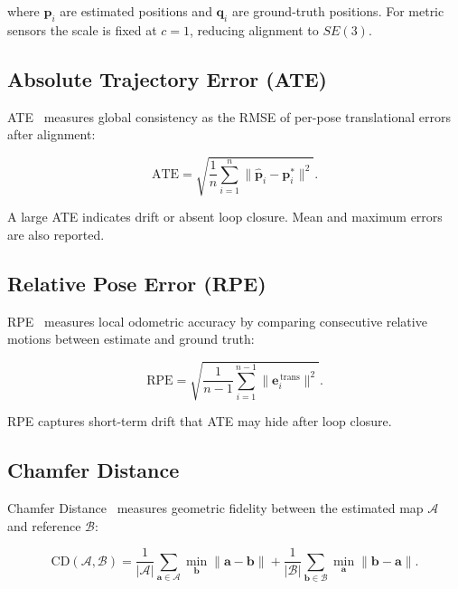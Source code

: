 \noindent where $\mathbf{p}_i$ are estimated positions and $\mathbf{q}_i$ are
ground-truth positions. For metric sensors the scale is fixed at $c = 1$,
reducing alignment to $SE(3)$.

\subsection{Absolute Trajectory Error (ATE)}

ATE~\cite{sturm2012benchmark} measures global consistency as the RMSE of
per-pose translational errors after alignment:

\begin{equation}
  \text{ATE} = \sqrt{\frac{1}{n}\sum_{i=1}^{n}
               \lVert \hat{\mathbf{p}}_i - \mathbf{p}_i^* \rVert^2}.
  \label{eq:ate}
\end{equation}

\noindent A large ATE indicates drift or absent loop closure. Mean and maximum
errors are also reported.

\subsection{Relative Pose Error (RPE)}

RPE~\cite{sturm2012benchmark} measures local odometric accuracy by comparing
consecutive relative motions between estimate and ground truth:

\begin{equation}
  \text{RPE} = \sqrt{\frac{1}{n-1}\sum_{i=1}^{n-1}
               \lVert \mathbf{e}_{i}^{\,\text{trans}} \rVert^2}.
  \label{eq:rpe}
\end{equation}

\noindent RPE captures short-term drift that ATE may hide after loop closure.

\subsection{Chamfer Distance}

Chamfer Distance~\cite{fan2017point} measures geometric fidelity between the
estimated map $\mathcal{A}$ and reference $\mathcal{B}$:

\begin{equation}
  \text{CD}(\mathcal{A},\mathcal{B}) =
    \frac{1}{|\mathcal{A}|}\sum_{\mathbf{a}\in\mathcal{A}}
      \min_{\mathbf{b}}\lVert\mathbf{a}-\mathbf{b}\rVert
    +
    \frac{1}{|\mathcal{B}|}\sum_{\mathbf{b}\in\mathcal{B}}
      \min_{\mathbf{a}}\lVert\mathbf{b}-\mathbf{a}\rVert.
  \label{eq:chamfer}
\end{equation}


